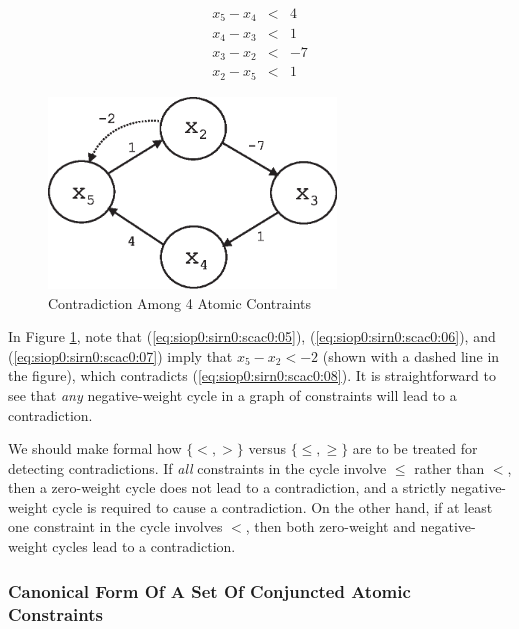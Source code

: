 \begin{eqnarray}
\label{eq:siop0:sirn0:scac0:05} 
   x_5 - x_4 & < & 4 \\
\label{eq:siop0:sirn0:scac0:06}
   x_4 - x_3 & < & 1 \\
\label{eq:siop0:sirn0:scac0:07}
   x_3 - x_2 & < & -7 \\
\label{eq:siop0:sirn0:scac0:08}
   x_2 - x_5 & < & 1
\end{eqnarray}

\begin{figure}
\centering
\includegraphics[height=2.0in]{s_iop0/cont01.eps}
\caption{Contradiction Among 4 Atomic Contraints}
\label{fig:siop0:sirn0:scac0:00}
\end{figure}

In Figure \ref{fig:siop0:sirn0:scac0:00},
note that 
(\ref{eq:siop0:sirn0:scac0:05}),
(\ref{eq:siop0:sirn0:scac0:06}),
and (\ref{eq:siop0:sirn0:scac0:07})
imply that $x_5 - x_2 < -2$ (shown with 
a dashed line in the figure), which contradicts
(\ref{eq:siop0:sirn0:scac0:08}).
It is straightforward to see that \emph{any} negative-weight
cycle in a graph of constraints will lead to a contradiction.

We should make formal how 
$\{ <, > \}$ versus $\{ \leq , \geq \}$ are to be treated for
detecting contradictions.  If \emph{all} constraints in the 
cycle involve $\leq$ rather than $<$, then a zero-weight cycle 
does not lead to a contradiction, and a strictly negative-weight
cycle is required to cause a contradiction.  On the other hand,
if at least one constraint in the cycle involves $<$, then both
zero-weight and negative-weight cycles lead to a contradiction.


\subsubsection{Canonical Form Of A Set Of Conjuncted Atomic Constraints}
\label{siop0:sirn0:scfs0}

